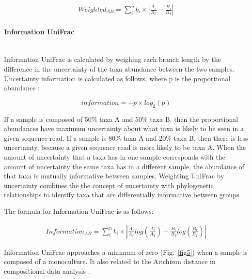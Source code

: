 \documentclass[10pt,letterpaper]{article}
\begin{document}
\begin{align*}
Weighted_{AB} = \sum_{i}^{n} b_{i} \times \left| \frac{A_{i}}{A_{T}} - \frac{B_{i}}{B_{T}} \right|
\end{align*}

\paragraph{Information UniFrac}\mbox{}\\
Information UniFrac is calculated by weighing each branch length by the difference in the uncertainty of the taxa abundance between the two samples. Uncertainty information is calculated as follows, where p is the proportional abundance \cite{shannon2001mathematical}:

\begin{equation}\label{eq:schemeP} 
information = - p  \times log_{2}(p)
\end{equation}

If a sample is composed of 50\% taxa A and 50\% taxa B, then the proportional abundances have maximum uncertainty about what taxa is likely to be seen in a given sequence read. If a sample is 80\% taxa A and 20\% taxa B, then there is less uncertainty, because a given sequence read is more likely to be taxa A. When the amount of uncertainty that a taxa has in one sample corresponds with the amount of uncertainty the same taxa has in a different sample, the abundance of that taxa is mutually informative between samples. Weighting UniFrac by uncertainty combines the the concept of uncertainty with phylogenetic relationships to identify taxa that are differentially informative between groups.

The formula for Information UniFrac is as follows:

\begin{align*}
Information_{AB} = \sum_{i}^{n} b_{i} \times \left| \frac{A_{i}}{A_{T}}log\left(\frac{A_{i}}{A_{T}}\right) - \frac{B_{i}}{B_{T}}log\left(\frac{B_{i}}{B_{T}}\right) \right|
\end{align*}

Information UniFrac approaches a minimum of zero (Fig.~\ref{fig5}) when a sample is composed of a monoculture. It also related to the Aitchison distance in compositional data analysis \cite{egozcue2011evidence}.
\end{document}
